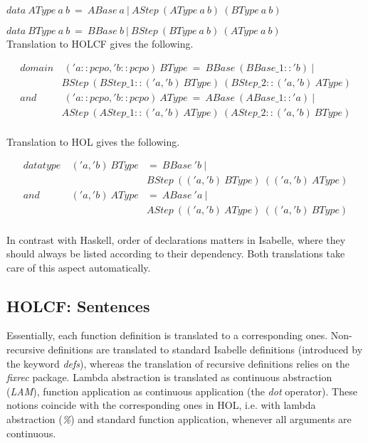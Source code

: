 \documentclass{llncs}
\begin{document}
$data \ AType \ a \ b \ = \ ABase \ a \ | \ AStep \ (AType \ a \ b) \ (BType \ a \ b)  $

$data \ BType \ a \ b \ = \ BBase \ b \ | \ BStep \ (BType \ a \ b) \ (AType \ a \ b) $\\

\noindent Translation to HOLCF gives the following.


$$\begin{array}{rr} domain & \ ('a::pcpo, 'b::pcpo) \ BType \ = \ BBase \ (BBase\_1::'b) \ | \\
  & BStep \ (BStep\_1::('a, 'b) \ BType) \ (BStep\_2::('a, 'b) \ AType) \\
  and & \ ('a::pcpo, 'b::pcpo) \ AType \ =  \ ABase \ (ABase\_1::'a) \ | \\
  & AStep \ (AStep\_1::('a, 'b) \ AType) \ (AStep\_2::('a, 'b) \ BType) \\
\end{array}$$

\noindent Translation to HOL gives the following.


$$\begin{array}{rll} datatype & \ ('a, 'b) \ BType & = \ BBase \ 'b \ | \\
  & & BStep \ (('a, 'b) \ BType) \ (('a, 'b) \ AType) \\
  and & \ ('a, 'b) \ AType & =  \ ABase \ 'a \ | \\
  & & AStep \ (('a, 'b) \ AType) \ (('a, 'b) \ BType) \\
\end{array}$$

\noindent In contrast with 
Haskell, order of declarations matters in Isabelle, where they should always
be listed according to their dependency. Both translations take care of this
aspect automatically.


\subsection{HOLCF: Sentences}

Essentially, each function definition is translated to a corresponding ones.
Non-recursive definitions are translated to standard Isabelle definitions
(introduced by the keyword \emph{defs}), whereas the translation of recursive
definitions relies on the \emph{fixrec} package.  Lambda abstraction is
translated as continuous abstraction (\emph{LAM}), function application as
continuous application (the \emph{dot} operator). These notions coincide with
the corresponding ones in HOL, i.e. with lambda abstraction (\emph{\%}) and
standard function application, whenever all arguments are continuous.
\end{document}
